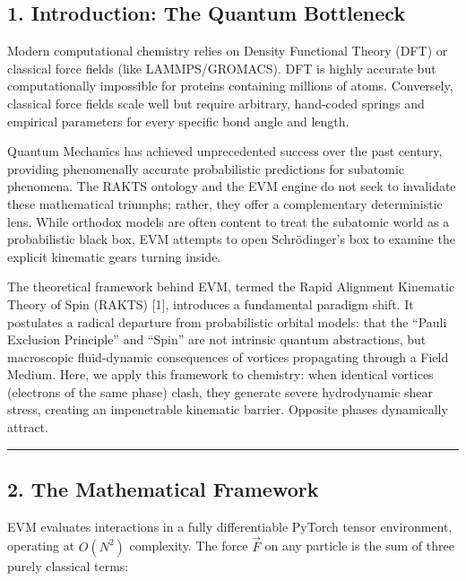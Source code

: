 \documentclass[
]{article}
\begin{document}
\subsection{1. Introduction: The Quantum
Bottleneck}\label{introduction-the-quantum-bottleneck}

Modern computational chemistry relies on Density Functional Theory (DFT)
or classical force fields (like LAMMPS/GROMACS). DFT is highly accurate
but computationally impossible for proteins containing millions of
atoms. Conversely, classical force fields scale well but require
arbitrary, hand-coded springs and empirical parameters for every
specific bond angle and length.

Quantum Mechanics has achieved unprecedented success over the past
century, providing phenomenally accurate probabilistic predictions for
subatomic phenomena. The RAKTS ontology and the EVM engine do not seek
to invalidate these mathematical triumphs; rather, they offer a
complementary deterministic lens. While orthodox models are often
content to treat the subatomic world as a probabilistic black box, EVM
attempts to open Schrödinger's box to examine the explicit kinematic
gears turning inside.

The theoretical framework behind EVM, termed the Rapid Alignment
Kinematic Theory of Spin (RAKTS) {[}1{]}, introduces a fundamental
paradigm shift. It postulates a radical departure from probabilistic
orbital models: that the ``Pauli Exclusion Principle'' and ``Spin'' are
not intrinsic quantum abstractions, but macroscopic fluid-dynamic
consequences of vortices propagating through a Field Medium. Here, we
apply this framework to chemistry: when identical vortices (electrons of
the same phase) clash, they generate severe hydrodynamic shear stress,
creating an impenetrable kinematic barrier. Opposite phases dynamically
attract.

\begin{center}\rule{0.5\linewidth}{0.5pt}\end{center}

\subsection{2. The Mathematical
Framework}\label{the-mathematical-framework}

EVM evaluates interactions in a fully differentiable PyTorch tensor
environment, operating at \(O(N^2)\) complexity. The force \(\vec{F}\)
on any particle is the sum of three purely classical terms:
\end{document}
